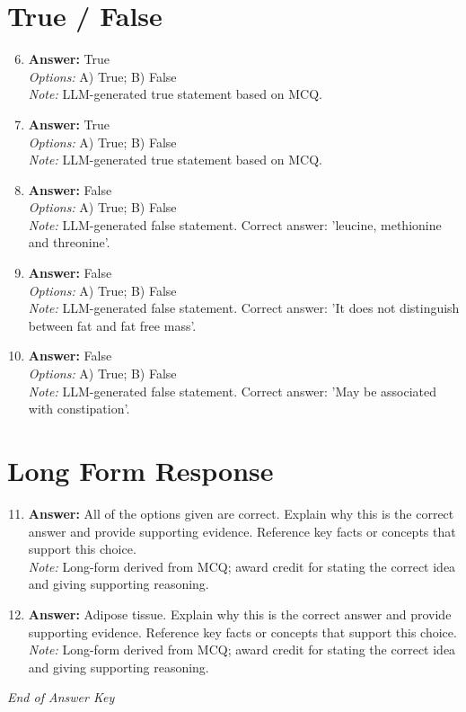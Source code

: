 \documentclass[12pt]{article}
\begin{document}
\section*{True / False}
\begin{enumerate}[label=\arabic*.]
\setcounter{enumi}{5}
\item \textbf{Answer:} True
\\ \textit{Options:} A) True; B) False
\\ \textit{Note:} LLM-generated true statement based on MCQ.
\item \textbf{Answer:} True
\\ \textit{Options:} A) True; B) False
\\ \textit{Note:} LLM-generated true statement based on MCQ.
\item \textbf{Answer:} False
\\ \textit{Options:} A) True; B) False
\\ \textit{Note:} LLM-generated false statement. Correct answer: 'leucine, methionine and threonine'.
\item \textbf{Answer:} False
\\ \textit{Options:} A) True; B) False
\\ \textit{Note:} LLM-generated false statement. Correct answer: 'It does not distinguish between fat and fat free mass'.
\item \textbf{Answer:} False
\\ \textit{Options:} A) True; B) False
\\ \textit{Note:} LLM-generated false statement. Correct answer: 'May be associated with constipation'.
\end{enumerate}

\section*{Long Form Response}
\begin{enumerate}[label=\arabic*.]
\setcounter{enumi}{10}
\item \textbf{Answer:} All of the options given are correct. Explain why this is the correct answer and provide supporting evidence. Reference key facts or concepts that support this choice.
\\ \textit{Note:} Long-form derived from MCQ; award credit for stating the correct idea and giving supporting reasoning.
\item \textbf{Answer:} Adipose tissue. Explain why this is the correct answer and provide supporting evidence. Reference key facts or concepts that support this choice.
\\ \textit{Note:} Long-form derived from MCQ; award credit for stating the correct idea and giving supporting reasoning.
\end{enumerate}

\vfill
\noindent\textit{End of Answer Key}
\end{document}
